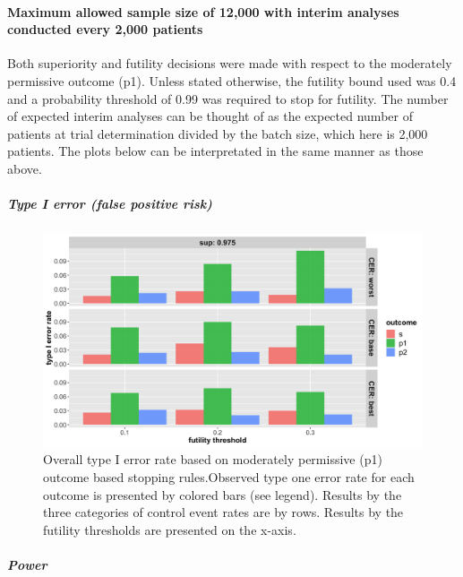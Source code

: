 \documentclass[]{article}
\let\oldparagraph\paragraph
\renewcommand{\paragraph}[1]{\oldparagraph{#1}\mbox{}}
\let\oldsubparagraph\subparagraph
\renewcommand{\subparagraph}[1]{\oldsubparagraph{#1}\mbox{}}
\begin{document}
\hypertarget{maximum-allowed-sample-size-of-12000-with-interim-analyses-conducted-every-2000-patients}{%
\paragraph{Maximum allowed sample size of 12,000 with interim analyses
conducted every 2,000
patients}\label{maximum-allowed-sample-size-of-12000-with-interim-analyses-conducted-every-2000-patients}}

Both superiority and futility decisions were made with respect to the
moderately permissive outcome (p1). Unless stated otherwise, the
futility bound used was 0.4 and a probability threshold of 0.99 was
required to stop for futility. The number of expected interim analyses
can be thought of as the expected number of patients at trial
determination divided by the batch size, which here is 2,000 patients.
The plots below can be interpretated in the same manner as those above.

\hypertarget{type-i-error-false-positive-risk-1}{%
\subparagraph{Type I error (false positive
risk)}\label{type-i-error-false-positive-risk-1}}

\captionsetup[figure]{font=small,labelfont=small}

\begin{figure}
  \caption{Overall type I error rate based on moderately permissive (p1) outcome based stopping rules.Observed type one error rate for each outcome is
  presented by colored bars (see legend). Results by the three categories of control event rates are by rows. Results by the futility thresholds are
  presented on the x-axis.}
  \includegraphics{../p1_plots/batch_size_nb_2000/type_1_error_p1.png}
\end{figure}

\hypertarget{power-1}{%
\subparagraph{Power}\label{power-1}}
\end{document}
